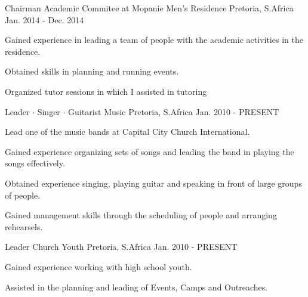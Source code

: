 

\begin{cventries}

  \cventry
    {Chairman} %
    {Academic Commitee at Mopanie Men's Residence} %
    {Pretoria, S.Africa} %
    {Jan. 2014 - Dec. 2014} %
    {
      \begin{cvitems} %
        \item {Gained experience in leading a team of people with the academic activities in the residence.}
        \item {Obtained skills in planning and running events.}
        \item {Organized tutor sessions in which I assisted in tutoring}
      \end{cvitems}
    }

  \cventry
    {Leader $\cdot$ Singer $\cdot$ Guitarist} %
    {Music} %
    {Pretoria, S.Africa} %
    {Jan. 2010 - PRESENT} %
    {
      \begin{cvitems} %
        \item {Lead one of the music bands at Capital City Church International.}
        \item {Gained experience organizing sets of songs and leading the band in playing the songs effectively.}
        \item {Obtained experience singing, playing guitar and speaking in front of large groups of people.}
        \item {Gained management skills through the scheduling of people and arranging rehearsels.}
      \end{cvitems}
    }

  \cventry
    {Leader} %
    {Church Youth} %
    {Pretoria, S.Africa} %
    {Jan. 2010 - PRESENT} %
    {
      \begin{cvitems} %
        \item {Gained experience working with high school youth.}
        \item {Assisted in the planning and leading of Events, Camps and Outreaches.}
      \end{cvitems}
    }


\end{cventries}
